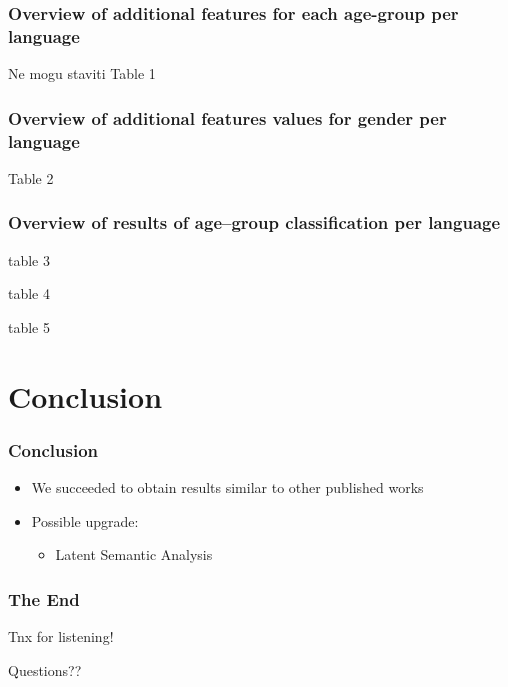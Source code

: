 \documentclass[utf8]{beamer}
\begin{document}
\begin{frame}
	\frametitle{Overview of additional features for each age-group per language}
	Ne mogu staviti Table 1 
\end{frame}

\begin{frame}
	\frametitle{Overview of additional features values for gender per language}
	Table 2
\end{frame}

\begin{frame}
	\frametitle{Overview of results of age–group classification per language}
	table 3	
\end{frame}


\begin{frame}
	table 4	
\end{frame}

\begin{frame}
	table 5	
\end{frame}
\section{Conclusion}
\frame{\tableofcontents[currentsection]}


\begin{frame}
	\frametitle{Conclusion}
	\begin{itemize}
		\item We succeeded to obtain results similar to other published works
		\item Possible upgrade:
		\begin{itemize}
			\item Latent Semantic Analysis
		\end{itemize}
	\end{itemize}
\end{frame}




\begin{frame}
	\frametitle{The End}
	\Huge{\centerline{Tnx for listening!}}
\end{frame}


\begin{frame}
\Huge{\centerline{Questions??}}
\end{frame}

\end{document}

